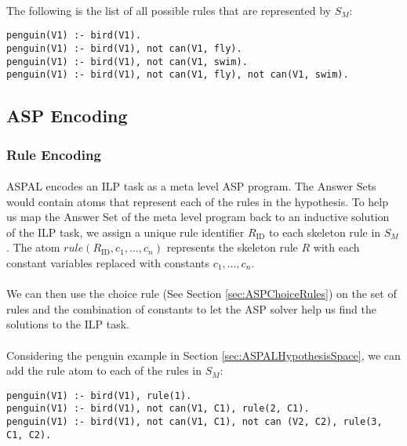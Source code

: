 \documentclass{article}
\theoremstyle{plain}
\theoremstyle{definition}
\begin{document}
\begin{multicols}{2}
\paragraph{} The following is the list of all possible rules that are represented by $S_M$:

\begin{lstlisting}
penguin(V1) :- bird(V1).
penguin(V1) :- bird(V1), not can(V1, fly).
penguin(V1) :- bird(V1), not can(V1, swim).
penguin(V1) :- bird(V1), not can(V1, fly), not can(V1, swim).
\end{lstlisting}

\subsection{ASP Encoding}

\subsubsection{Rule Encoding}

\paragraph{} ASPAL encodes an ILP task as a meta level ASP program. The Answer Sets would contain atoms that represent each of the rules in the hypothesis. To help us map the Answer Set of the meta level program back to an inductive solution of the ILP task, we assign a unique rule identifier $R_\text{ID}$ to each skeleton rule in $S_M$. The atom $rule(R_\text{ID}, c_1, \dots, c_n)$ represents the skeleton rule $R$ with each constant variables replaced with constants $c_1, \dots, c_n$.

\paragraph{} We can then use the choice rule (See Section \ref{sec:ASPChoiceRules}) on the set of rules and the combination of constants to let the ASP solver help us find the solutions to the ILP task.

\paragraph{} Considering the penguin example in Section \ref{sec:ASPALHypothesisSpace}, we can add the rule atom to each of the rules in $S_M$:

\begin{lstlisting}
penguin(V1) :- bird(V1), rule(1).
penguin(V1) :- bird(V1), not can(V1, C1), rule(2, C1).
penguin(V1) :- bird(V1), not can(V1, C1), not can (V2, C2), rule(3, C1, C2).
\end{lstlisting}


\end{multicols}
\end{document}
